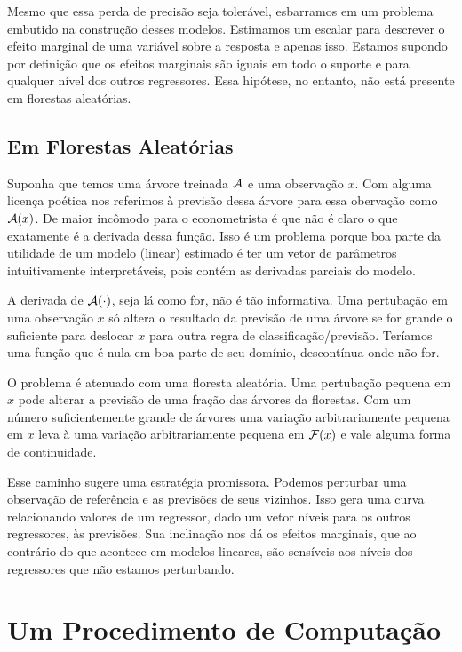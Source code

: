 Mesmo que essa perda de precisão seja tolerável, esbarramos em um problema embutido na construção desses modelos. Estimamos um escalar para descrever o efeito marginal de uma variável sobre a resposta e apenas isso. Estamos supondo por definição que os efeitos marginais são iguais em todo o suporte e para qualquer nível dos outros regressores. Essa hipótese, no entanto, não está presente em florestas aleatórias.

\subsection{Em Florestas Aleatórias}

Suponha que temos uma árvore treinada $\mathcal{A}$ e uma observação $x$. Com alguma licença poética nos referimos à previsão dessa árvore para essa obervação como $\mathcal{A}(x)$. De maior incômodo para o econometrista é que não é claro o que exatamente é a derivada dessa função. Isso é um problema porque boa parte da utilidade de um modelo (linear) estimado é ter um vetor de parâmetros intuitivamente interpretáveis, pois contém as derivadas parciais do modelo. 

A derivada de $\mathcal{A}(\cdot)$, seja lá como for, não é tão informativa. Uma pertubação em uma observação $x$ só altera o resultado da previsão de uma árvore se for grande o suficiente para deslocar $x$ para outra regra de classificação/previsão. Teríamos uma função que é nula em boa parte de seu domínio, descontínua onde não for. 

O problema é atenuado com uma floresta aleatória. Uma pertubação pequena em $x$ pode alterar a previsão de uma fração das árvores da florestas. Com um número suficientemente grande de árvores uma variação arbitrariamente pequena em $x$ leva à uma variação arbitrariamente pequena em $\mathcal{F}(x)$ e vale alguma forma de continuidade. 

Esse caminho sugere uma estratégia promissora. Podemos perturbar uma observação de referência e as previsões de seus vizinhos. Isso gera uma curva relacionando valores de um regressor, dado um vetor níveis para os outros regressores, às previsões. Sua inclinação nos dá os efeitos marginais, que ao contrário do que acontece em modelos lineares, são sensíveis aos níveis dos regressores que não estamos perturbando.

\section{Um Procedimento de Computação}

